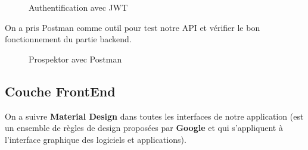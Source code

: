 \begin{figure}[H]
	\caption{\label{fig:my-label} Authentification avec JWT}
\end{figure}

On a pris Postman comme outil pour test notre \gls{API} et v\'erifier le bon fonctionnement du partie backend.

\begin{figure}[H]
	\caption{\label{fig:my-label} Prospektor avec Postman}
\end{figure}

\subsection{Couche FrontEnd}

On a suivre \textbf{Material Design} dans toutes les interfaces de notre application (est un ensemble de r\`egles de design propos\'ees par \textbf{Google} et qui s'appliquent \`a l'interface graphique des logiciels et applications).


